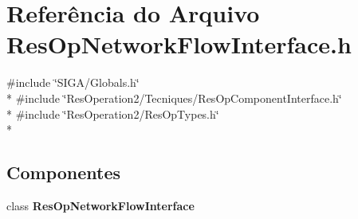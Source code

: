 \section{Referência do Arquivo Res\+Op\+Network\+Flow\+Interface.\+h}
\label{_res_op_network_flow_interface_8h}
{\ttfamily \#include \char`\"{}S\+I\+G\+A/\+Globals.\+h\char`\"{}}\\*
{\ttfamily \#include \char`\"{}Res\+Operation2/\+Tecniques/\+Res\+Op\+Component\+Interface.\+h\char`\"{}}\\*
{\ttfamily \#include \char`\"{}Res\+Operation2/\+Res\+Op\+Types.\+h\char`\"{}}\\*
\subsection*{Componentes}
\begin{DoxyCompactItemize}
\item 
class {\bf Res\+Op\+Network\+Flow\+Interface}
\end{DoxyCompactItemize}
